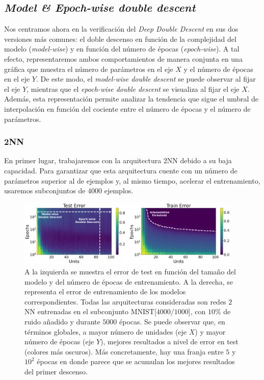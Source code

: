 \subsection{\textit{Model \& Epoch-wise double descent}}\label{subsec:model-epoch-wise}

Nos centramos ahora en la verificación del \textit{Deep Double Descent} en sus dos versiones más comunes: el doble descenso en función de la complejidad del modelo (\textit{model-wise}) y en función del número de épocas (\textit{epoch-wise}). A tal efecto, representaremos ambos comportamientos de manera conjunta en una gráfica que muestra el número de parámetros en el eje $X$ y el número de épocas en el eje $Y$. De este modo, el \textit{model-wise double descent} se puede observar al fijar el eje $Y$, mientras que el \textit{epoch-wise double descent} se visualiza al fijar el eje $X$. Además, esta representación permite analizar la tendencia que sigue el umbral de interpolación en función del cociente entre el número de épocas y el número de parámetros.

\subsubsection{2NN}\label{subsubsec:model-epoch-wise-2NN}

En primer lugar, trabajaremos con la arquitectura $2$NN debido a su baja capacidad. Para garantizar que esta arquitectura cuente con un número de parámetros superior al de ejemplos y, al mismo tiempo, acelerar el entrenamiento, usaremos subconjuntos de $4000$ ejemplos.

\begin{figure}[h]
    \centering
    \includegraphics[width=0.95\textwidth]{img/experiments/model-epoch2NNMNIST.png}
    \caption[Doble descenso en función del tamaño del modelo y del número de épocas para la red $2$NN y un subconjunto de MNIST.]{A la izquierda se muestra el error de test en función del tamaño del modelo y del número de épocas de entrenamiento. A la derecha, se representa el error de entrenamiento de los modelos correspondientes. Todas las arquitecturas consideradas son redes $2$NN entrenadas en el subconjunto MNIST[$4000/1000$], con $10\%$ de ruido añadido y durante $5000$ épocas. Se puede observar que, en términos globales, a mayor número de unidades (eje $X$) y mayor número de épocas (eje $Y$), mejores resultados a nivel de error en test (colores más oscuros). Más concretamente, hay una franja entre $5$ y $10^2$ épocas en donde parece que se acumulan los mejores resultados del primer descenso.}\label{fig:model-epoch2NNMNIST}
\end{figure}

